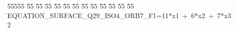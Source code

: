 %
%
\begin{tabbing}
55555 \= 55 \= 55 \= 55 \= 55 \= 55 \= 55 \= 55 \= 55 \= 55 \= 55 \= 55 \= 55 \= \>EQUATION\_SURFACE\_Q29\_ISO4\_ORB7\_F1=11*x1\ +\ 6*x2\ +\ 7*x3\\[0pt]
2\>\end{tabbing}
